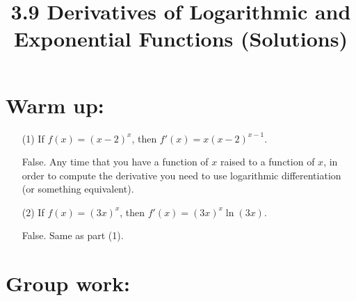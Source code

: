 \documentclass[nooutcomes]{ximera}
\title{3.9 Derivatives of Logarithmic and Exponential Functions (Solutions)}
\begin{document}
\begin{abstract}		\end{abstract}
\maketitle

\section*{Warm up:} 
	\begin{enumerate}
	
	\item[(1)]  If $f(x) = (x-2)^x$, then $f'(x) = x (x-2)^{x-1}$.

		\begin{freeResponse}
		False.  Any time that you have a function of $x$ raised to a function of $x$, in order to compute the derivative you need to use logarithmic differentiation (or something equivalent).
		\end{freeResponse}	
		
		
		
	\item[(2)]  If $f(x) = (3x)^x$, then $f'(x) = (3x)^x \ln (3x)$.

		\begin{freeResponse}
		False.  Same as part (1).  
		\end{freeResponse}	
		
		
		
	\end{enumerate}
		
		
		

	
	
	
	
	

\section*{Group work:}
\end{document}
